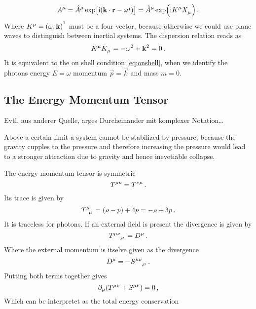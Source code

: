 \begin{equation}
    \tensor{A}{^\mu}=\tensor{\hat{A}}{^\mu}
    \exp\left[\imI(\vec{k}\cdot\vec{r}-\omega
    t)\right]
    =\tensor{\hat{A}}{^\mu}\exp\left(\imI\tensor{K}{^\mu} \tensor{X}{_\mu}\right)\,
    .
\end{equation}
Where $\tensor{K}{^\mu}=\left(\omega,\vec{k}\right)\transpose$ must be a four
vector, because otherwise we could use plane waves to distinguish between
inertial systems. The dispersion relation reads as
\begin{equation}
    \tensor{K}{^\mu}\tensor{K}{_\mu}=-\omega^2+\vec{k}^2=0\, .
\end{equation}
It is equivalent to the on shell condition \eqref{eq:onshell}, when we identify
the photons energy $E=\omega$ momentum $\vec{p}=\vec{k}$ and mass $m=0$.
\subsection{The Energy Momentum Tensor}
Evtl. aus anderer Quelle, arges Durcheinander mit komplexer Notation\ldots
\begin{sidenote}
Above a certain limit a system cannot be stabilized by pressure, because the
gravity cupples to the pressure and therefore increasing the pressure would lead
to a stronger attraction due to gravity and hence inevetiable collapse.
\end{sidenote}
The energy momentum tensor is symmetric
\begin{equation}
    \tensor{T}{^\mu^\nu}=\tensor{T}{^\nu^\mu}\, .
\end{equation}
Its trace is given by
\begin{equation}
    \tensor{T}{^\mu_\mu}=(\varrho-p)+4p=-\varrho+3p\, .
\end{equation}
It is traceless for photons. If an external field is present the divergence is
given by
\begin{equation}
    \tensor{T}{^\mu^\nu_,_\nu}=\tensor{D}{^\mu}\,  .
\end{equation}
Where the external momentum is itselve given as the divergence
\begin{equation}
    \tensor{D}{^\mu} =-\tensor{S}{^\mu^\nu_,_\nu}\, .
\end{equation}
Putting both terms together gives
\begin{equation}
    \partial_\mu(\tensor{T}{^\mu^\nu}+\tensor{S}{^\mu^\nu})=0\,,
\end{equation}
Which can be interpretet as the total energy conservation
